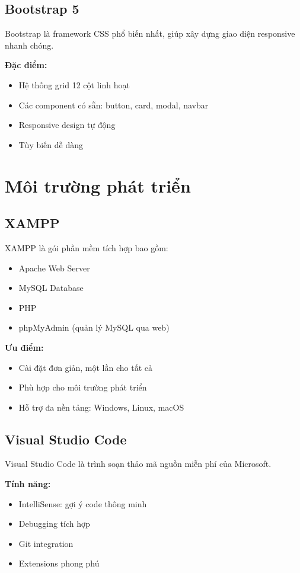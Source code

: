 \documentclass[12pt,a4paper]{report}
\begin{document}
\subsection{Bootstrap 5}

Bootstrap là framework CSS phổ biến nhất, giúp xây dựng giao diện responsive nhanh chóng.

\textbf{Đặc điểm:}
\begin{itemize}
    \item Hệ thống grid 12 cột linh hoạt
    \item Các component có sẵn: button, card, modal, navbar
    \item Responsive design tự động
    \item Tùy biến dễ dàng
\end{itemize}

\section{Môi trường phát triển}

\subsection{XAMPP}

XAMPP là gói phần mềm tích hợp bao gồm:
\begin{itemize}
    \item Apache Web Server
    \item MySQL Database
    \item PHP
    \item phpMyAdmin (quản lý MySQL qua web)
\end{itemize}

\textbf{Ưu điểm:}
\begin{itemize}
    \item Cài đặt đơn giản, một lần cho tất cả
    \item Phù hợp cho môi trường phát triển
    \item Hỗ trợ đa nền tảng: Windows, Linux, macOS
\end{itemize}

\subsection{Visual Studio Code}

Visual Studio Code là trình soạn thảo mã nguồn miễn phí của Microsoft.

\textbf{Tính năng:}
\begin{itemize}
    \item IntelliSense: gợi ý code thông minh
    \item Debugging tích hợp
    \item Git integration
    \item Extensions phong phú
\end{itemize}
\end{document}
